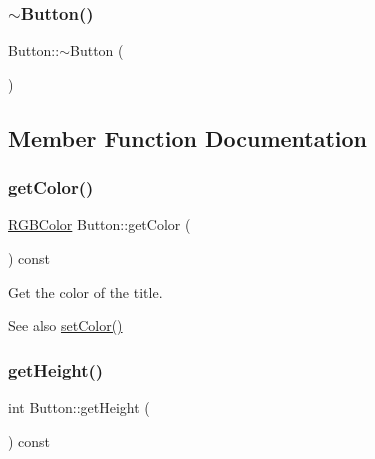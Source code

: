 \mbox{\label{class_button_a2a001eb9c3cc8ae54768a850dd345002}} 
\subsubsection{\texorpdfstring{$\sim$\+Button()}{~Button()}}
{\footnotesize\ttfamily Button\+::$\sim$\+Button (\begin{DoxyParamCaption}{ }\end{DoxyParamCaption})\hspace{0.3cm}{\ttfamily [virtual]}}



\subsection{Member Function Documentation}
\mbox{\label{class_button_a3388931e8e8cef41336f973578304c8a}} 
\subsubsection{\texorpdfstring{get\+Color()}{getColor()}}
{\footnotesize\ttfamily \mbox{\hyperlink{class_r_g_b_color}{R\+G\+B\+Color}} Button\+::get\+Color (\begin{DoxyParamCaption}{ }\end{DoxyParamCaption}) const\hspace{0.3cm}{\ttfamily [virtual]}}



Get the color of the title. 

\begin{DoxySeeAlso}{See also}
\mbox{\hyperlink{class_button_a87418f0a2d9ecbff822627e4e728728e}{set\+Color()}} 
\end{DoxySeeAlso}
\mbox{\label{class_button_ab4e3a35e683df269eb4b178632694dbf}} 
\subsubsection{\texorpdfstring{get\+Height()}{getHeight()}}
{\footnotesize\ttfamily int Button\+::get\+Height (\begin{DoxyParamCaption}{ }\end{DoxyParamCaption}) const\hspace{0.3cm}{\ttfamily [virtual]}}

